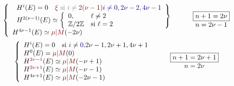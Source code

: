 \[
\left\{\begin{array}{l}
\left.\begin{array}{l}
H^i(E)=0\quad
\deleted{\unsure{\xi}}\ \deleted{\text{si }i\ne\unsure{2(\nu-1)}}
\inserted{i\ne0,2\nu-2,4\nu-1}\\
H^{2(\nu-1)}(E)\simeq
\left\{\begin{array}{ll}0,&\ell\ne2\\
\mathbb Z/2\mathbb Z&\text{si }\ell=2
\end{array}\right.
\end{array}\right\}\\
H^{4\nu-1}(E)\simeq\unsure{\mu|M}(-2\nu)
\end{array}\right.
\qquad
\begin{array}{c}\boxed{n+1=2\nu}\\n=2\nu-1\end{array}
\]
\[
\left\{\begin{array}{l}
H^i(E)=0\quad\text{si }i\ne\inserted{0,}2\nu-1,2\nu+1,4\nu+1\\
H^0(E)=\unsure{\mu|M}(0)\\
H^{\unsure{2\nu-1}}(E)\simeq\unsure{\mu|M}(-\nu+1)\\
H^{\unsure{2\nu+1}}(E)\simeq\unsure{\mu|M}(-\nu-1)\\
H^{4\nu+1}(E)\simeq\unsure{\mu|M}(-2\nu-1)
\end{array}\right.
\qquad
\begin{array}{c}\boxed{n+1=2\nu+1}\\n=2\nu\end{array}
\]


